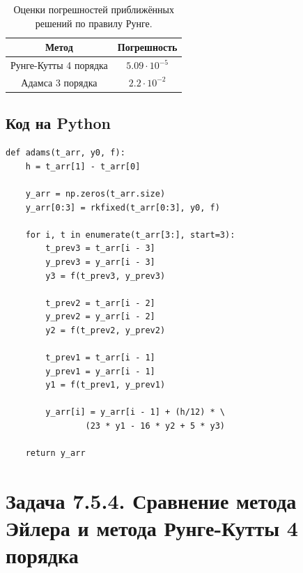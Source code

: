 \documentclass[12pt]{article}%
\begin{document}
\begin{table}[!h]
    \centering
    \begin{tabular}{|c|c|}
    \hline Метод & Погрешность \\
    \hline Рунге-Кутты 4 порядка & $5.09 \cdot 10^{-5}$ \\
    \hline Адамса 3 порядка & $2.2 \cdot 10^{-2}$ \\
    \hline
    \end{tabular}
    \caption{Оценки погрешностей приближённых решений по правилу Рунге.}
\end{table}

\subsection{Код на Python}
\begin{verbatim}
def adams(t_arr, y0, f):
    h = t_arr[1] - t_arr[0]

    y_arr = np.zeros(t_arr.size)
    y_arr[0:3] = rkfixed(t_arr[0:3], y0, f)
    
    for i, t in enumerate(t_arr[3:], start=3):
        t_prev3 = t_arr[i - 3]
        y_prev3 = y_arr[i - 3]
        y3 = f(t_prev3, y_prev3)

        t_prev2 = t_arr[i - 2]
        y_prev2 = y_arr[i - 2]
        y2 = f(t_prev2, y_prev2)

        t_prev1 = t_arr[i - 1]
        y_prev1 = y_arr[i - 1]
        y1 = f(t_prev1, y_prev1)

        y_arr[i] = y_arr[i - 1] + (h/12) * \
                (23 * y1 - 16 * y2 + 5 * y3)

    return y_arr
\end{verbatim}

\newpage
\section{Задача 7.5.4. Сравнение метода Эйлера и метода Рунге-Кутты 4 порядка}
\end{document}
